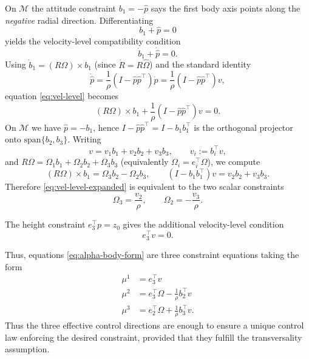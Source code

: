 \documentclass[letterpaper, 10 pt, conference]{ieeeconf}
\begin{document}
On $\mathcal{M}$ the attitude constraint $b_1=-\hat{p}$ says the first body axis points along the \emph{negative} radial direction. Differentiating
\[
b_1 + \hat{p} = 0
\]
yields the velocity-level compatibility condition
\begin{equation}\label{eq:vel-level}
\dot b_1 + \dot{\hat{p}} = 0.
\end{equation}
Using $\dot b_1 = (R \Omega)\times b_1$ (since $\dot R = R\widehat\Omega$) and the standard identity
\[
\dot{\hat{p}}  = \frac{1}{\rho}(I-\hat{p}\hat{p}^\top)\dot p = \frac{1}{\rho}(I-\hat{p}\hat{p}^\top)v,
\]
equation \eqref{eq:vel-level} becomes
\begin{equation}\label{eq:vel-level-expanded}
(R \Omega)\times b_1 + \frac{1}{\rho}(I-\hat{p}\hat{p}^\top)v=0.
\end{equation}
On $\mathcal{M}$ we have $\hat{p}=-b_1$, hence $I-\hat{p}\hat{p}^\top = I-b_1b_1^\top$ is the orthogonal projector onto $\mathrm{span}\{b_2,b_3\}$. Writing
\[
v=v_1 b_1+v_2 b_2+v_3 b_3,\qquad v_i:=b_i^\top v,
\]
and $R\Omega=\Omega_1 b_1+\Omega_2 b_2+\Omega_3 b_3$ (equivalently $\Omega_i=e_i^\top \Omega$), we compute
\[
(R \Omega)\times b_1 = \Omega_3 b_2 - \Omega_2 b_3,\qquad (I-b_1b_1^\top)v=v_2 b_2+v_3 b_3.
\]
Therefore \eqref{eq:vel-level-expanded} is equivalent to the two scalar constraints
\begin{equation}\label{eq:Omega23-constraints}
\Omega_3 = \frac{v_2}{\rho},\qquad \Omega_2 = -\frac{v_3}{\rho}.
\end{equation}

The height constraint $e_3^\top p=z_0$ gives the additional velocity-level condition
\begin{equation}\label{eq:height-vel}
e_3^\top v=0.
\end{equation}

Thus, equations \eqref{eq:alpha-body-form} are three constraint equations taking the form
\begin{equation*}
    \begin{split}
        \mu^{1} & = e_3^\top v \\
        \mu^{2} & = e_3^\top \Omega - \frac{1}{\rho}b_{2}^\top v \\
        \mu^{3} & = e_2^\top \Omega + \frac{1}{\rho}b_{3}^\top v.
    \end{split}
\end{equation*}
Thus the three effective control directions are enough to ensure a unique control law enforcing the desired constraint, provided that they fulfill the transversality assumption.
\end{document}
